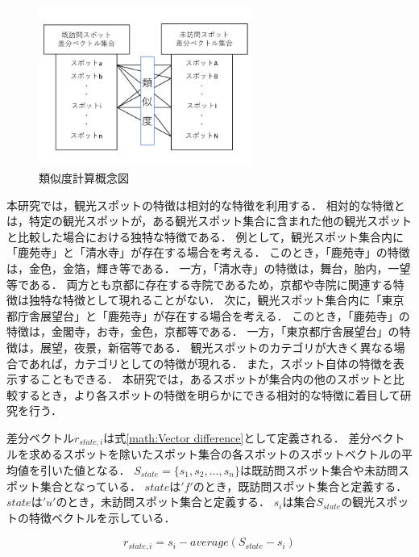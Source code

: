 \documentclass{deimj}
\begin{document}
\begin{figure}[t]
  \begin{center}
    \includegraphics[clip,width=7.0cm]{picture/Photo_CosSim_jap.png}
    \caption{類似度計算概念図}
    \label{fig:photo_cossim}
    \end{center}
\end{figure}

本研究では，観光スポットの特徴は相対的な特徴を利用する．
相対的な特徴とは，特定の観光スポットが，ある観光スポット集合に含まれた他の観光スポットと比較した場合における独特な特徴である．
例として，観光スポット集合内に「鹿苑寺」と「清水寺」が存在する場合を考える．
このとき，「鹿苑寺」の特徴は，金色，金箔，輝き等である．
一方，「清水寺」の特徴は，舞台，胎内，一望等である．
両方とも京都に存在する寺院であるため，京都や寺院に関連する特徴は独特な特徴として現れることがない．
次に，観光スポット集合内に「東京都庁舎展望台」と「鹿苑寺」が存在する場合を考える．
このとき，「鹿苑寺」の特徴は，金閣寺，お寺，金色，京都等である．
一方，「東京都庁舎展望台」の特徴は，展望，夜景，新宿等である．
観光スポットのカテゴリが大きく異なる場合であれば，カテゴリとしての特徴が現れる．
また，スポット自体の特徴を表示することもできる．
本研究では，あるスポットが集合内の他のスポットと比較するとき，より各スポットの特徴を明らかにできる相対的な特徴に着目して研究を行う．

差分ベクトル$r_{state,i}$は式\ref{math:Vector difference}として定義される．
差分ベクトルを求めるスポットを除いたスポット集合の各スポットのスポットベクトルの平均値を引いた値となる．
$S_{state} =\{s_1,s_2,\dots,s_n\}$は既訪問スポット集合や未訪問スポット集合となっている．
$state$は$'f'$のとき，既訪問スポット集合と定義する．
$state$は$'u'$のとき，未訪問スポット集合と定義する．
$s_i$は集合$S_{state}$の観光スポットの特徴ベクトルを示している．

\begin{equation}
  r_{state,i}=s_i-average(S_{state}-s_i)
  \label{math:Vector difference}
\end{equation}
\end{document}
